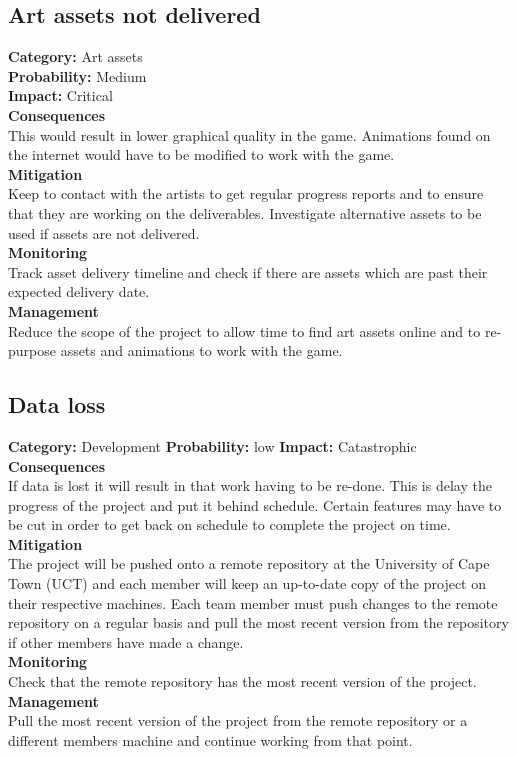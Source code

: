 \documentclass[a4paper,10pt]{article}
\begin{document}
\subsection{Art assets not delivered}
\textbf{Category:} Art assets\\
\textbf{Probability:} Medium\\
\textbf{Impact:} Critical
\\\textbf{Consequences}\\
This would result in lower graphical quality in the game.
Animations found on the internet would have to be modified to work with the game.
\smallskip\\\textbf{Mitigation}\\
Keep to contact with the artists to get regular progress reports and to ensure that they are working on the deliverables. Investigate alternative assets to be used if assets are not delivered.
\smallskip\\\textbf{Monitoring}\\
Track asset delivery timeline and check if there are assets which are past their expected delivery date.
\smallskip\\\textbf{Management}\\
Reduce the scope of the project to allow time to find art assets online and to re-purpose assets and animations to work with the game.
\subsection{Data loss}
\textbf{Category:} Development\newline
\textbf{Probability:} low\newline
\textbf{Impact:} Catastrophic
\\\textbf{Consequences}\\
If data is lost it will result in that work having to be re-done. This is delay the progress of the project and put it behind schedule. Certain features may have to be cut in order to get back on schedule to complete the project on time.
\smallskip\\\textbf{Mitigation}\\
The project will be pushed onto a remote repository at the University of Cape Town (UCT) and each member will keep an up-to-date copy of the project on their respective machines. Each team member must push changes to the remote repository on a regular basis and pull the most recent version from the repository if other members have made a change.
\smallskip\\\textbf{Monitoring}\\
Check that the remote repository has the most recent version of the project.
\smallskip\\\textbf{Management}\\
Pull the most recent version of the project from the remote repository or a different members machine and continue working from that point.
\end{document}
